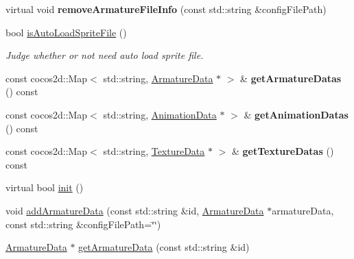 \begin{DoxyCompactItemize}
\mbox{\label{classcocostudio_1_1ArmatureDataManager_ad92cbd6101717fdbb85b656e91c8898a}} 
virtual void {\bfseries remove\+Armature\+File\+Info} (const std\+::string \&config\+File\+Path)
\item 
\mbox{\label{classcocostudio_1_1ArmatureDataManager_af799c20a271544234f00a85d380d9d75}} 
bool \hyperlink{classcocostudio_1_1ArmatureDataManager_af799c20a271544234f00a85d380d9d75}{is\+Auto\+Load\+Sprite\+File} ()
\begin{DoxyCompactList}\small\item\em Judge whether or not need auto load sprite file. \end{DoxyCompactList}\item 
\mbox{\label{classcocostudio_1_1ArmatureDataManager_a1995bf9e5571d580df24411f77a68855}} 
const cocos2d\+::\+Map$<$ std\+::string, \hyperlink{classcocostudio_1_1ArmatureData}{Armature\+Data} $\ast$ $>$ \& {\bfseries get\+Armature\+Datas} () const
\item 
\mbox{\label{classcocostudio_1_1ArmatureDataManager_a134cfa037d2efc7d13c08ab4a4743af7}} 
const cocos2d\+::\+Map$<$ std\+::string, \hyperlink{classcocostudio_1_1AnimationData}{Animation\+Data} $\ast$ $>$ \& {\bfseries get\+Animation\+Datas} () const
\item 
\mbox{\label{classcocostudio_1_1ArmatureDataManager_aa52c8d33342a1440c2cf8b7e2d8b91ee}} 
const cocos2d\+::\+Map$<$ std\+::string, \hyperlink{classcocostudio_1_1TextureData}{Texture\+Data} $\ast$ $>$ \& {\bfseries get\+Texture\+Datas} () const
\item 
virtual bool \hyperlink{classcocostudio_1_1ArmatureDataManager_ae9e571092820f26fc2c6a841a91b2b38}{init} ()
\item 
void \hyperlink{classcocostudio_1_1ArmatureDataManager_ad07ea60328afc77cd0787d6fc79ae519}{add\+Armature\+Data} (const std\+::string \&id, \hyperlink{classcocostudio_1_1ArmatureData}{Armature\+Data} $\ast$armature\+Data, const std\+::string \&config\+File\+Path=\char`\"{}\char`\"{})
\item 
\hyperlink{classcocostudio_1_1ArmatureData}{Armature\+Data} $\ast$ \hyperlink{classcocostudio_1_1ArmatureDataManager_a19d1df9bd2bfa449ac9187450d17ad1b}{get\+Armature\+Data} (const std\+::string \&id)

\end{DoxyCompactItemize}
